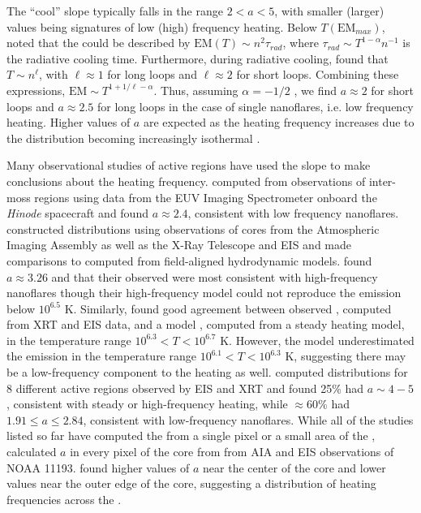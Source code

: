 The ``cool'' \dem{} slope typically falls in the range $2<a<5$, with smaller (larger) values being signatures of low (high) frequency heating. Below $T(\mathrm{EM}_{max})$, \citet{cargill_implications_1994} noted that the \dem{} could be described by $\mathrm{EM}(T)\sim n^2\tau_{rad}$, where $\tau_{rad}\sim T^{1-\alpha}n^{-1}$ is the radiative cooling time. Furthermore, during radiative cooling, \citet{bradshaw_cooling_2010} found that $T\sim n^{\ell}$, with $\ell\approx1$ for long loops and $\ell\approx2$ for short loops. Combining these expressions, $\mathrm{EM}\sim T^{1+1/\ell-\alpha}$. Thus, assuming $\alpha=-1/2$ \citep[i.e. using the radiative losses of][]{rosner_dynamics_1978}, we find $a\approx2$ for short loops and $a\approx2.5$ for long loops in the case of single nanoflares, i.e. low frequency heating. Higher values of $a$ are expected as the heating frequency increases due to the \dem{} distribution becoming increasingly isothermal \citep{cargill_active_2014}. 

Many observational studies of active regions have used the \dem{} slope to make conclusions about the heating frequency. \citet{tripathi_emission_2011} computed \dem{} from observations of inter-moss regions using data from the EUV Imaging Spectrometer \citep[EIS][]{culhane_euv_2007} onboard the \textit{Hinode} spacecraft \citep{kosugi_hinode_2007} and found $a\approx2.4$, consistent with low frequency nanoflares. \citet{warren_constraints_2011} constructed \dem{} distributions using observations of \AR{} cores from the Atmospheric Imaging Assembly \citep[AIA][]{lemen_atmospheric_2012} as well as the X-Ray Telescope \citep[XRT][]{golub_x-ray_2007} and EIS and made comparisons to \dem{} computed from field-aligned hydrodynamic models. \citeauthor{warren_constraints_2011} found $a\approx3.26$ and that their observed \dem{} were most consistent with high-frequency nanoflares though their high-frequency model could not reproduce the emission below $10^{6.5}$ K. Similarly, \citet{winebarger_using_2011} found good agreement between observed \dem{}, computed from XRT and EIS data, and a model \dem{}, computed from a steady heating model, in the temperature range $10^{6.3}<T<10^{6.7}$ K. However, the model \dem{} underestimated the emission in the temperature range $10^{6.1}<T<10^{6.3}$ K, suggesting there may be a low-frequency component to the heating as well. \citet{schmelz_cold_2012} computed \dem{} distributions for 8 different active regions observed by EIS and XRT and found 25\% had $a\sim4-5$, consistent with steady or high-frequency heating, while $\approx60\%$ had $1.91\le a\le2.84$, consistent with low-frequency nanoflares. While all of the studies listed so far have computed the \dem{} from a single pixel or a small area of the \AR{}, \citet{del_zanna_evolution_2015} calculated $a$ in every pixel of the \AR{} core from from AIA and EIS observations of NOAA 11193. \citeauthor{del_zanna_evolution_2015} found higher values of $a$ near the center of the core and lower values near the outer edge of the core, suggesting a distribution of heating frequencies across the \AR{}.


